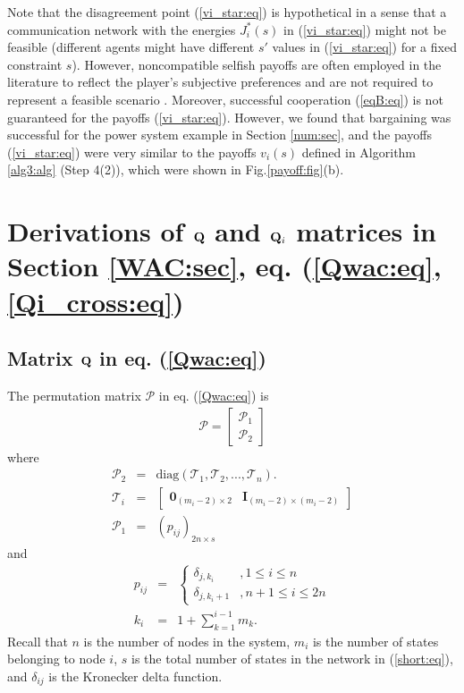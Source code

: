 \documentclass[12pt, draftclsnofoot,onecolumn]{IEEEtran}
\begin{document}
 Note that the disagreement point (\ref{vi_star:eq}) is hypothetical in a sense that a communication network with the energies $J_i^*(s)$ in (\ref{vi_star:eq}) might not be feasible (different agents might have different $s'$ values in (\ref{vi_star:eq}) for a fixed constraint $s$). However, noncompatible selfish payoffs are often employed in the literature to reflect the player's subjective preferences and are not required to represent a feasible scenario \cite{Avrachenkov2015265,kawamori2016nash}. Moreover, successful cooperation ({\ref{eqB:eq}}) is not guaranteed for the payoffs (\ref{vi_star:eq}). However, we found that bargaining was successful for the power system example in Section \ref{num:sec}, and the payoffs ({\ref{vi_star:eq}}) were very similar to the payoffs $v_i(s)$ defined in Algorithm {\ref{alg3:alg}} (Step 4(2)), which were shown in Fig.{\ref{payoff:fig}}(b).


\newpage
\section{Derivations of $\bf Q$ and ${\bf Q}_i$ matrices in Section \ref{WAC:sec}, eq. (\ref{Qwac:eq},\ref{Qi_cross:eq})}


 \subsection{Matrix $\bf{Q}$ in eq. (\ref{Qwac:eq})}

The permutation matrix $\mathcal P$ in eq. (\ref{Qwac:eq}) is
\begin{eqnarray}
\mathcal P =\begin{bmatrix}
\mathcal P_1\\ \hline \mathcal P_2\end{bmatrix}
\end{eqnarray}
\noindent where
\begin{eqnarray}
\mathcal P_2 &=& \mathrm{diag}(\mathcal T_1, \mathcal T_2,..., \mathcal T_n). \\
\mathcal T_i &=& \begin{bmatrix}{\boldsymbol 0}_{(m_i-2)\times 2} &{\boldsymbol I}_{(m_i-2)\times(m_i-2)}\end{bmatrix}\\
\mathcal P_1 &=& (p_{ij})_{2n\times s}
\end{eqnarray}
\noindent and
\begin{eqnarray}
p_{ij} &=& \left\{\begin{array}{cl} \delta_{j,k_i} & , 1\leq i \leq n\\
\delta_{j,k_i+1} & , n+1\leq i \leq 2n \end{array}\right.\nonumber\\
k_i &=& 1+ \sum_{k=1}^{i-1}{m_k}. 
\end{eqnarray}
\noindent Recall that $n$ is the number of nodes in the system, $m_i$ is the number of states belonging to node $i$, $s$ is the total number of states in the network in (\ref{short:eq}), and $\delta_{ij}$ is the Kronecker delta function.
\end{document}
